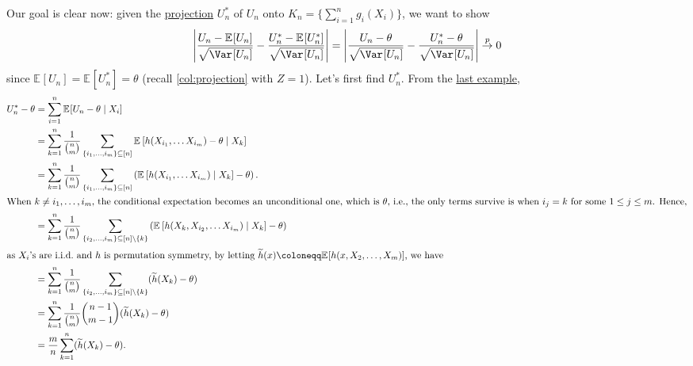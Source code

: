 Our goal is clear now: given the \hyperref[def:projection]{projection} \(U_n^{\ast} \) of \(U_n\) onto \(K_n = \{ \sum_{i=1}^{n} g_i(X_i) \} \), we want to show
\[
	\left\vert \frac{U_n - \mathbb{E}_{}[U_n] }{\sqrt{\Var_{}[U_n] } } - \frac{U_n^{\ast} - \mathbb{E}_{}[U_n^{\ast} ] }{\sqrt{\Var_{}[U_n] } } \right\vert
	= \left\vert \frac{U_n - \theta }{\sqrt{\Var_{}[U_n] } } - \frac{U_n^{\ast} - \theta }{\sqrt{\Var_{}[U_n] } } \right\vert
	\overset{p}{\to} 0
\]
since \(\mathbb{E}_{}[U_n] = \mathbb{E}_{}[U_n^{\ast} ] = \theta \) (recall \autoref{col:projection} with \(Z = 1\)). Let's first find \(U_n^{\ast} \). From the \hyperref[eg:projection]{last example},
\begin{align*}
	U_n^{\ast} - \theta
	 & = \sum_{i=1}^{n} \mathbb{E}_{}[U_n - \theta \mid X_i]                                                                                                                                             \\
	 & = \sum_{k=1}^{n} \frac{1}{\binom{n}{m}} \sum_{\{ i_1, \dots , i_m \} \subseteq [n] } \mathbb{E}_{}\left[h(X_{i_1}, \dots X_{i_m}) - \theta \mid X_k\right]                                        \\
	 & = \sum_{k=1}^{n} \frac{1}{\binom{n}{m}} \sum_{\{ i_1, \dots , i_m \} \subseteq [n] } \left( \mathbb{E}_{}\left[h(X_{i_1}, \dots X_{i_m}) \mid X_k\right] - \theta \right).                        \\
	\shortintertext{When \(k \neq i_1, \dots , i_m\), the conditional expectation becomes an unconditional one, which is \(\theta \), i.e., the only terms survive is when \(i_j = k\) for some \(1 \leq j \leq m\). Hence,}
	 & = \sum_{k=1}^{n} \frac{1}{\binom{n}{m}} \sum_{\{ i_2, \dots , i_m \} \subseteq [n] \setminus \{ k \} } \left( \mathbb{E}_{}\left[h(X_k, X_{i_2}, \dots X_{i_m}) \mid X_k \right] - \theta \right) \\
	\shortintertext{as \(X_i\)'s are i.i.d.\ and \(h\) is permutation symmetry, by letting \(\widetilde{h} (x) \coloneqq \mathbb{E}_{}[h(x, X_2, \dots , X_m)] \), we have}
	 & = \sum_{k=1}^{n} \frac{1}{\binom{n}{m}} \sum_{\{ i_2, \dots , i_m \} \subseteq [n] \setminus \{ k \} } ( \widetilde{h} (X_k) - \theta )                                                           \\
	 & =  \sum_{k=1}^{n} \frac{1}{\binom{n}{m}} \binom{n-1}{m-1} ( \widetilde{h} (X_k) - \theta )                                                                                                        \\
	 & = \frac{m}{n} \sum_{k=1}^{n} (\widetilde{h} (X_k) - \theta ).
\end{align*}

